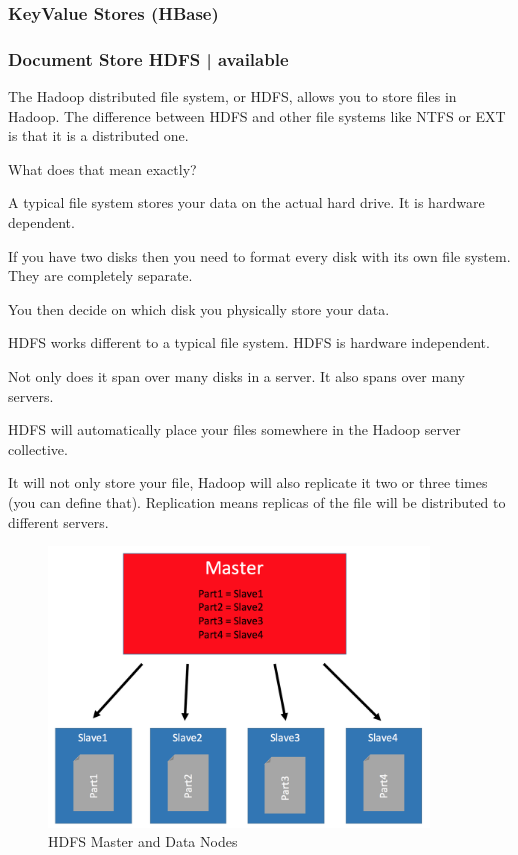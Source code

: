 \documentclass[12pt]{scrartcl} %
\begin{document}
\subsubsection{KeyValue Stores (HBase)}
\subsubsection{Document Store HDFS | available}

The Hadoop distributed file system, or HDFS, allows you to store files in Hadoop. The difference between HDFS and other file systems like NTFS or EXT is that it is a distributed one.

What does that mean exactly?

A typical file system stores your data on the actual hard drive. It is hardware dependent.

If you have two disks then you need to format every disk with its own file system. They are completely separate.

You then decide on which disk you physically store your data.

HDFS works different to a typical file system. HDFS is hardware independent.

Not only does it span over many disks in a server. It also spans over many servers.

HDFS will automatically place your files somewhere in the Hadoop server collective.

It will not only store your file, Hadoop will also replicate it two or three times (you can define that). Replication means replicas of the file will be distributed to different servers.

\begin{figure}[htbp] 
  \centering
     \includegraphics[width=0.9\textwidth]{images/HDFS-Master-DataNodes}
  \caption{HDFS Master and Data Nodes}
  \label{fig:Bild1}
\end{figure}
\end{document}
